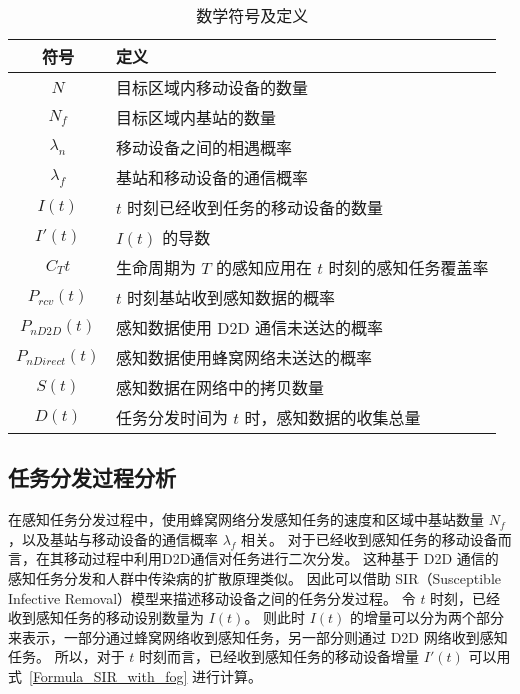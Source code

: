 \begin{table}[h]
  \caption{数学符号及定义}
  \vspace{-0.5em}
  \centering
  \label{table_notations_UIC}
  \begin{tabular}{|c|p{9.5cm}|}
  \hline
  \textbf{符号} & \textbf{定义}\\
  \hline
  $N$ & 目标区域内移动设备的数量\\\hline
  $N_f$ & 目标区域内基站的数量\\\hline
  $\lambda_n$ & 移动设备之间的相遇概率\\\hline
  $\lambda_f$ & 基站和移动设备的通信概率\\\hline
  $I(t)$ & $t$ 时刻已经收到任务的移动设备的数量\\\hline
  $I'(t)$ & $I(t)$ 的导数\\\hline
  $C_T{t}$ & 生命周期为 $T$ 的感知应用在 $t$ 时刻的感知任务覆盖率\\\hline
  $P_{rcv}(t)$ & $t$ 时刻基站收到感知数据的概率\\\hline
  $P_{nD2D}(t)$ & 感知数据使用 D2D 通信未送达的概率\\\hline
  $P_{nDirect}(t)$ & 感知数据使用蜂窝网络未送达的概率\\\hline
  $S(t)$ & 感知数据在网络中的拷贝数量\\\hline
  $D(t)$ & 任务分发时间为 $t$ 时，感知数据的收集总量\\\hline
\end{tabular}
\end{table}

\subsection{任务分发过程分析}

在感知任务分发过程中，使用蜂窝网络分发感知任务的速度和区域中基站数量 $N_f$，以及基站与移动设备的通信概率 $\lambda_f$ 相关。
对于已经收到感知任务的移动设备而言，在其移动过程中利用D2D通信对任务进行二次分发。
这种基于 D2D 通信的感知任务分发和人群中传染病的扩散原理类似。
因此可以借助 SIR（Susceptible Infective Removal）模型来描述移动设备之间的任务分发过程。
令 $t$ 时刻，已经收到感知任务的移动设别数量为 $I(t)$。
则此时 $I(t)$ 的增量可以分为两个部分来表示，一部分通过蜂窝网络收到感知任务，另一部分则通过 D2D 网络收到感知任务。
所以，对于 $t$ 时刻而言，已经收到感知任务的移动设备增量 $I'(t)$ 可以用式~\eqref{Formula_SIR_with_fog} 进行计算。


